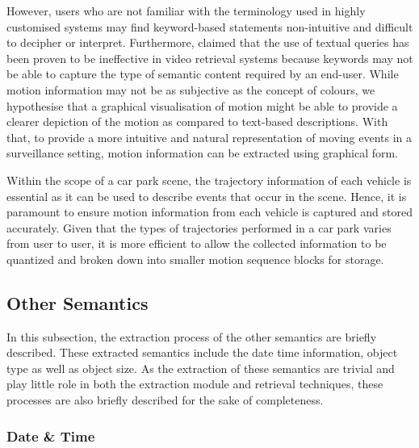 However, users who are not familiar with the terminology used in highly customised systems may find keyword-based statements non-intuitive and difficult to decipher or interpret.
Furthermore,  claimed that the use of textual queries has been proven to be ineffective in video retrieval systems because keywords may not be able to capture the type of semantic content required by an end-user.
While motion information may not be as subjective as the concept of colours, we hypothesise that a graphical visualisation of motion might be able to provide a clearer depiction of the motion as compared to text-based descriptions.
With that, to provide a more intuitive and natural representation of moving events in a surveillance setting, motion information can be extracted using graphical form.

Within the scope of a car park scene, the trajectory information of each vehicle is essential as it can be used to describe events that occur in the scene.
Hence, it is paramount to ensure motion information from each vehicle is captured and stored accurately.
Given that the types of trajectories performed in a car park varies from user to user, %
it is more efficient to allow the collected information to be quantized and broken down into smaller motion sequence blocks for storage.

\vspace{1em}
\subsection{Other Semantics}

In this subsection, the extraction process of the other semantics are briefly described. These extracted semantics include the date time information, object type as well as object size. As the extraction of these semantics are trivial and play little role in both the extraction module and retrieval techniques, these processes are also briefly described for the sake of completeness.

\vspace{1em}
\subsubsection{Date \& Time}

